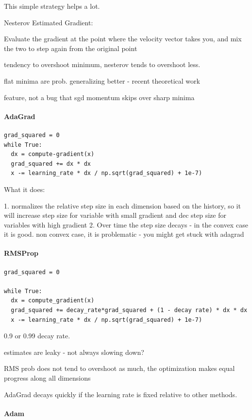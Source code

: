This simple strategy helps a lot.

Nesterov Estimated Gradient: 

Evaluate the gradient at the point where the velocity vector takes you, and mix the two to step again from the original point

tendency to overshoot minimum, nesterov tends to overshoot less.

flat minima are prob. generalizing better - recent theoretical work

feature, not a bug that sgd momentum skips over sharp minima

\paragraph{AdaGrad}

\begin{verbatim}
grad_squared = 0
while True:
  dx = compute-gradient(x)
  grad_squared += dx * dx 
  x -= learning_rate * dx / np.sqrt(grad_squared) + 1e-7)
\end{verbatim}

What it does: 

1. normalizes the relative step size in each dimension based on the history, so it will increase step size for variable with small gradient and dec step size for variables with high gradient
2. Over time the step size decays - in the convex case it is good. non convex case, it is problematic - you might get stuck with adagrad

\paragraph{RMSProp}
\begin{verbatim}
grad_squared = 0

while True:
  dx = compute_gradient(x)
  grad_squared += decay_rate*grad_squared + (1 - decay rate) * dx * dx
  x -= learning_rate * dx / np.sqrt(grad_squared) + 1e-7)
\end{verbatim}

0.9 or 0.99 decay rate.

estimates are leaky - not always slowing down?

RMS prob does not tend to overshoot as much, the optimization makes equal progress along all dimensions

AdaGrad decays quickly if the learning rate is fixed relative to other methods.

\paragraph{Adam}

